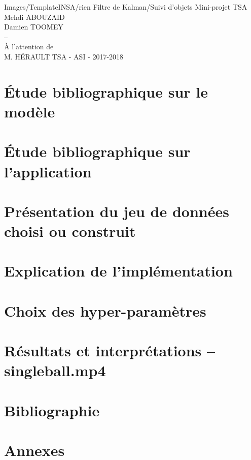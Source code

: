 \documentclass[12pt,a4paper]{article}
\begin{document}
\PageDeGarde
{Images/TemplateINSA/rien} %
{Filtre de Kalman/Suivi d'objets} %
{Mini-projet TSA} %
{Mehdi \textsc{ABOUZAID}\\
 Damien \textsc{TOOMEY}\\
 --\\
 À l'attention de \\ M. \textsc{HÉRAULT}} %
{TSA - ASI - 2017-2018} %


\newpage
\tableofcontents

\newpage
\section{Étude bibliographique sur le modèle}


\newpage
\section{Étude bibliographique sur l'application}


\newpage
\section{Présentation du jeu de données choisi ou construit}


\newpage
\section{Explication de l'implémentation}


\newpage
\section{Choix des hyper-paramètres}


\newpage
\section{Résultats et interprétations \--- singleball.mp4}


\newpage
\section{Bibliographie}


\newpage
\section{Annexes}

\end{document}
